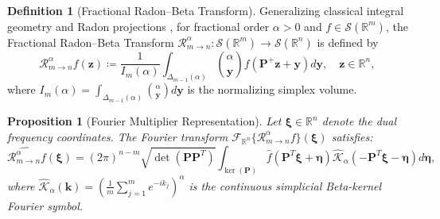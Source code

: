 \documentclass[11pt,a4paper]{article}
\theoremstyle{plain}
\newtheorem{proposition}[theorem]{Proposition}
\theoremstyle{definition}
\newtheorem{definition}[theorem]{Definition}
\theoremstyle{remark}
\numberwithin{equation}{section}
\begin{document}
\begin{definition}[Fractional Radon--Beta Transform]
Generalizing classical integral geometry and Radon projections \cite{helgason2011}, for fractional order $\alpha > 0$ and $f \in \mathcal{S}(\mathbb{R}^m)$, the Fractional Radon--Beta Transform $\mathcal{R}_{m \to n}^\alpha : \mathcal{S}(\mathbb{R}^m) \to \mathcal{S}(\mathbb{R}^n)$ is defined by
\begin{equation}
\label{eq:radon_beta_def}
\mathcal{R}_{m \to n}^\alpha f(\mathbf{z}) \coloneqq \frac{1}{I_m(\alpha)} \int_{\Delta_{m-1}(\alpha)} \binom{\alpha}{\mathbf{y}} f\left(\mathbf{P}^+ \mathbf{z} + \mathbf{y}\right) d\mathbf{y}, \quad \mathbf{z} \in \mathbb{R}^n,
\end{equation}
where $I_m(\alpha) = \int_{\Delta_{m-1}(\alpha)} \binom{\alpha}{\mathbf{y}} d\mathbf{y}$ is the normalizing simplex volume.
\end{definition}

\begin{proposition}[Fourier Multiplier Representation]
Let $\boldsymbol{\xi} \in \mathbb{R}^n$ denote the dual frequency coordinates. The Fourier transform $\mathcal{F}_{\mathbb{R}^n}\{\mathcal{R}_{m \to n}^\alpha f\}(\boldsymbol{\xi})$ satisfies:
\begin{equation}
\widehat{\mathcal{R}_{m \to n}^\alpha f}(\boldsymbol{\xi}) = (2\pi)^{n-m} \sqrt{\det(\mathbf{P}\mathbf{P}^T)} \int_{\operatorname{ker}(\mathbf{P})} \widehat{f}\left(\mathbf{P}^T \boldsymbol{\xi} + \boldsymbol{\eta}\right) \widehat{\mathcal{K}}_\alpha\left(-\mathbf{P}^T \boldsymbol{\xi} - \boldsymbol{\eta}\right) d\boldsymbol{\eta},
\end{equation}
where $\widehat{\mathcal{K}}_\alpha(\mathbf{k}) = \left(\frac{1}{m}\sum_{j=1}^m e^{-ik_j}\right)^\alpha$ is the continuous simplicial Beta-kernel Fourier symbol.
\end{proposition}
\end{document}
